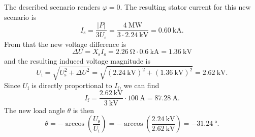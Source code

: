 \begin{solutionblock}
    The described scenario renders $\varphi=0$. The resulting stator current for this new scenario is
    $$
    I_\mathrm{s} = \frac{|P|}{3 U_\mathrm{s}} = \frac{\SI{4}{\mega\watt}}{3 \cdot \SI{2.24}{\kilo\volt}} = \SI{0.60}{\kilo\ampere}.$$
    From that the new voltage difference is
    $$
    \Delta U = X_\mathrm{s} I_\mathrm{s} = \SI{2.26}{\ohm} \cdot \SI{0.6}{\kilo\ampere} = \SI{1.36}{\kilo\volt}
    $$
    and the resulting induced voltage magnitude is
    $$
    U_\mathrm{i} = \sqrt{U_\mathrm{s}^2 + \Delta U^2} = \sqrt{(\SI{2.24}{\kilo\volt})^2 + (\SI{1.36}{\kilo\volt})^2} = \SI{2.62}{\kilo\volt}.
    $$
    Since $U_\mathrm{i}$ is directly proportional to $I_\mathrm{f}$, we can find
    $$
    I_\mathrm{f} = \frac{\SI{2.62}{\kilo\volt}}{\SI{3}{\kilo\volt}} \cdot\SI{100}{\ampere} = \SI{87.28}{\ampere}.
    $$
    The new load angle $\theta$ is then
    $$
    \theta = -\arccos\left(\frac{U_\mathrm{s}}{U_\mathrm{i}}\right) = -\arccos\left(\frac{\SI{2.24}{\kilo\volt}}{\SI{2.62}{\kilo\volt}}\right) = \SI{-31.24}{\degree}.
    $$
\end{solutionblock}




